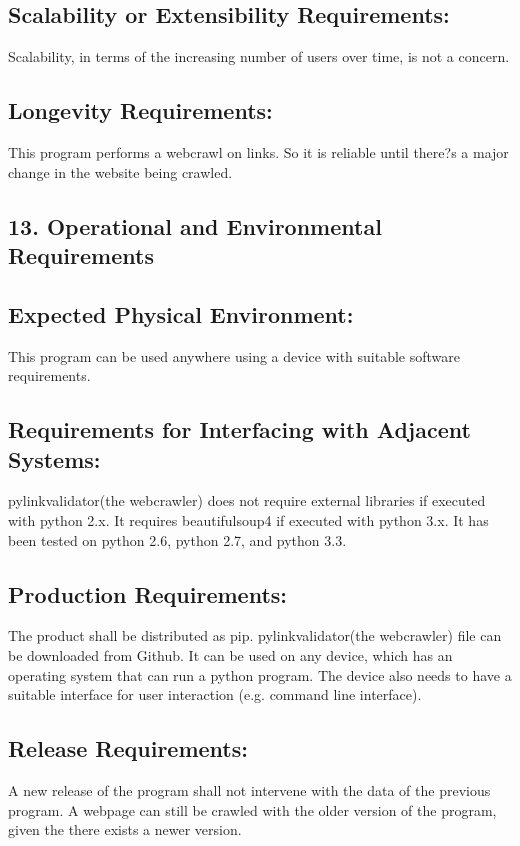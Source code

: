 \documentclass[12pt]{article}
\begin{document}
\subsection{Scalability or Extensibility Requirements:}
Scalability, in terms of the increasing number of users over time, is not a concern.

\subsection{Longevity Requirements:}
This program performs a webcrawl on links. So it is reliable until there?s a major change in the website being crawled.

\subsection{13. Operational and Environmental Requirements }

\subsection{Expected Physical Environment:}
This program can be used anywhere using a device with suitable software requirements. 

\subsection{Requirements for Interfacing with Adjacent Systems:}
pylinkvalidator(the webcrawler) does not require external libraries if executed with python 2.x. It requires beautifulsoup4 if executed with python 3.x. It has been tested on python 2.6, python 2.7, and python 3.3.


\subsection{Production Requirements:}

The product shall be distributed as pip. pylinkvalidator(the webcrawler) file can be downloaded from Github. It can be used on any device, which has an operating system that can run a python program. The device also needs to have a suitable interface for user interaction (e.g. command line interface).


\subsection{Release Requirements: }
A new release of the program shall not intervene with the data of the previous program. A webpage can still be crawled with the older version of the program, given the there exists a newer version.
\end{document}
